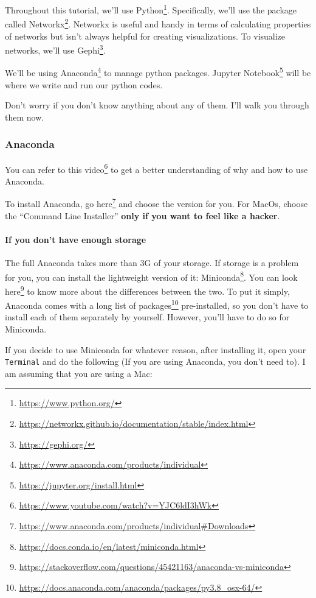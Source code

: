 \documentclass[
]{krantz}
\renewcommand{\href}[2]{#2\footnote{\url{#1}}}
\begin{document}
Throughout this tutorial, we'll use \href{https://www.python.org/}{Python}. Specifically, we'll use the package called \href{https://networkx.github.io/documentation/stable/index.html}{Networkx}. Networkx is useful and handy in terms of calculating properties of networks but isn't always helpful for creating visualizations. To visualize networks, we'll use \href{https://gephi.org/}{Gephi}.

We'll be using \href{https://www.anaconda.com/products/individual}{Anaconda} to manage python packages. \href{https://jupyter.org/install.html}{Jupyter Notebook} will be where we write and run our python codes.

Don't worry if you don't know anything about any of them. I'll walk you through them now.

\hypertarget{anaconda}{%
\subsubsection{Anaconda}\label{anaconda}}

You can refer to \href{https://www.youtube.com/watch?v=YJC6ldI3hWk}{this video} to get a better understanding of why and how to use Anaconda.

To install Anaconda, go \href{https://www.anaconda.com/products/individual\#Downloads}{here} and choose the version for you. For MacOs, choose the ``Command Line Installer'' \textbf{only if you want to feel like a hacker}.

\hypertarget{if-you-dont-have-enough-storage}{%
\paragraph{If you don't have enough storage}\label{if-you-dont-have-enough-storage}}

The full Anaconda takes more than 3G of your storage. If storage is a problem for you, you can install the lightweight version of it: \href{https://docs.conda.io/en/latest/miniconda.html}{Miniconda}. You can look \href{https://stackoverflow.com/questions/45421163/anaconda-vs-miniconda}{here} to know more about the differences between the two. To put it simply, Anaconda comes with \href{https://docs.anaconda.com/anaconda/packages/py3.8_osx-64/}{a long list of packages} pre-installed, so you don't have to install each of them separately by yourself. However, you'll have to do so for Miniconda.

If you decide to use Miniconda for whatever reason, after installing it, open your \texttt{Terminal} and do the following (If you are using Anaconda, you don't need to). I am assuming that you are using a Mac:
\end{document}
